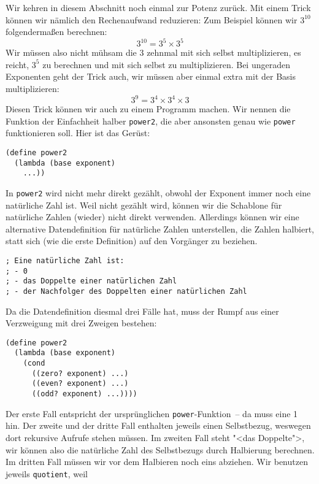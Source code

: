 Wir kehren in diesem Abschnitt noch einmal zur Potenz zurück.  Mit
einem Trick können wir nämlich den Rechenaufwand reduzieren: Zum
Beispiel können wir $3^{10}$ folgendermaßen berechnen:
%
\begin{displaymath}
  3^{10}   = 3^5 \times 3^5
\end{displaymath}
%
Wir müssen also nicht mühsam die 3 zehnmal mit sich selbst
multiplizieren, es reicht, $3^5$ zu berechnen und mit sich selbst zu
multiplizieren.  Bei ungeraden Exponenten geht der Trick auch, wir müssen aber einmal extra
mit der Basis multiplizieren:
%
\begin{displaymath}
  3^9   = 3^4 \times 3^4 \times 3
\end{displaymath}
%
Diesen Trick können wir auch zu einem Programm machen.  Wir nennen die
Funktion der Einfachheit halber \lstinline{power2}, die aber ansonsten
genau wie \lstinline{power} funktionieren soll.  Hier ist das Gerüst:\label{function:power2}
%
\begin{lstlisting}
(define power2
  (lambda (base exponent)
    ...))
\end{lstlisting}
%
In \lstinline{power2} wird nicht mehr direkt gezählt, obwohl der
Exponent immer noch eine natürliche Zahl ist.  Weil nicht gezählt
wird, können wir die Schablone für natürliche Zahlen (wieder) nicht
direkt verwenden.  Allerdings können wir eine alternative
Datendefinition für natürliche Zahlen unterstellen, die Zahlen
halbiert, statt sich (wie die erste Definition) auf den Vorgänger zu beziehen.
%
\begin{lstlisting}
; Eine natürliche Zahl ist:
; - 0
; - das Doppelte einer natürlichen Zahl
; - der Nachfolger des Doppelten einer natürlichen Zahl
\end{lstlisting}
%
Da die Datendefinition diesmal drei Fälle hat, muss der Rumpf aus
einer Verzweigung mit drei Zweigen bestehen:
%
\begin{lstlisting}
(define power2
  (lambda (base exponent)
    (cond
      ((zero? exponent) ...)
      ((even? exponent) ...)
      ((odd? exponent) ...))))
\end{lstlisting}
%
Der erste Fall entspricht der ursprünglichen
\lstinline{power}-Funktion~-- da muss eine 1 hin.  Der zweite und der
dritte Fall enthalten jeweils einen Selbstbezug, weswegen dort
rekursive Aufrufe stehen müssen.  Im zweiten Fall steht "<das
Doppelte">, wir können also die natürliche Zahl des Selbstbezugs durch
Halbierung berechnen.  Im dritten Fall müssen wir vor dem Halbieren
noch eins abziehen.  Wir benutzen jeweils \lstinline{quotient}, weil
